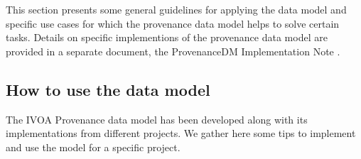 %

This section presents some general guidelines for applying the data model and
specific use cases for which the provenance data model helps to solve certain tasks. Details on specific implementions of the provenance data model are provided in a separate document, the ProvenanceDM Implementation Note \citep{std:ProvenanceImplementationNote}.


\subsection{How to use the data model}

The IVOA Provenance data model has been developed along with its implementations from different projects. 
We gather here some tips to implement and use the model for a specific project.

